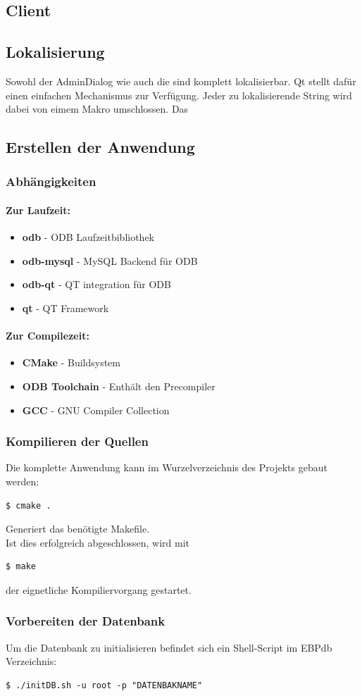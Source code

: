 \subsection{Client}

\subsection{Lokalisierung}
Sowohl der AdminDialog wie auch die \EBP sind komplett lokalisierbar. Qt stellt dafür einen einfachen Mechanismus zur Verfügung. Jeder zu lokalisierende String wird dabei von eimem Makro umschlossen. Das 
\subsection{Erstellen der Anwendung}
\subsubsection{Abhängigkeiten}
\paragraph{Zur Laufzeit:}
\begin{itemize}
	\item \textbf{odb} - ODB Laufzeitbibliothek
	\item \textbf{odb-mysql} - MySQL Backend für ODB
	\item \textbf{odb-qt} - QT integration für ODB
	\item \textbf{qt} - QT Framework
\end{itemize}
\paragraph{Zur Compilezeit:}
\begin{itemize}
	\item \textbf{CMake} - Buildsystem
	\item \textbf{ODB Toolchain} - Enthält den Precompiler
	\item \textbf{GCC} - GNU Compiler Collection
\end{itemize}
\subsubsection{Kompilieren der Quellen}
Die komplette Anwendung kann im Wurzelverzeichnis des Projekts gebaut werden:\\
\begin{lstlisting}
$ cmake .
\end{lstlisting}
Generiert das benötigte Makefile.\\
Ist dies erfolgreich abgeschlossen, wird mit\\
\begin{lstlisting}
$ make
\end{lstlisting}
der eignetliche Kompiliervorgang gestartet.\\
\subsubsection{Vorbereiten der Datenbank}
Um die Datenbank zu initialisieren befindet sich ein Shell-Script im EBPdb Verzeichnis:\\
\begin{lstlisting}
$ ./initDB.sh -u root -p "DATENBAKNAME"
\end{lstlisting}
